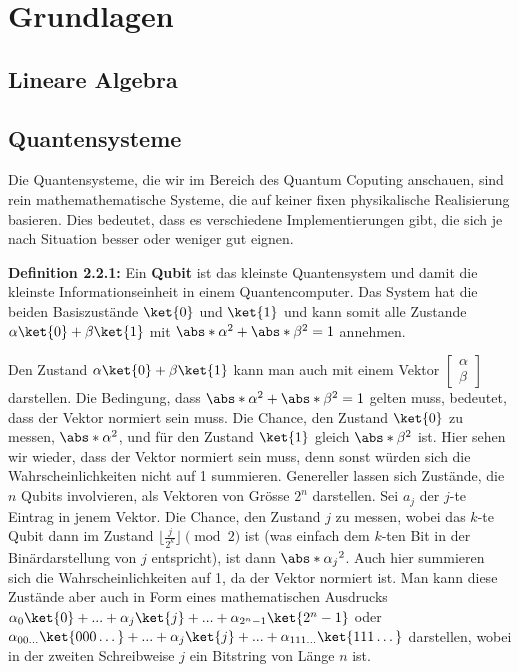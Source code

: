 \chapter{Grundlagen}
\section{Lineare Algebra}

\section{Quantensysteme}
Die Quantensysteme, die wir im Bereich des Quantum Coputing anschauen, sind rein mathemathematische Systeme, die auf keiner fixen physikalische Realisierung basieren. Dies bedeutet, dass es verschiedene Implementierungen gibt, die sich je nach Situation besser oder weniger gut eignen.

\textbf{Definition 2.2.1:} Ein \textbf{Qubit} ist das kleinste Quantensystem und damit die kleinste Informationseinheit in einem Quantencomputer. Das System hat die beiden Basiszustände $\ket{0}$ und $\ket{1}$ und kann somit alle Zustande $\alpha\ket{0} + \beta\ket{1}$ mit $\abs*{\alpha}^2 + \abs*{\beta}^2 = 1$ annehmen.

Den Zustand $\alpha\ket{0} + \beta\ket{1}$ kann man auch mit einem Vektor $\begin{bmatrix}\alpha \\ \beta\end{bmatrix}$ darstellen. Die Bedingung, dass $\abs*{\alpha}^2 + \abs*{\beta}^2 = 1$ gelten muss, bedeutet, dass der Vektor normiert sein muss. Die Chance, den Zustand $\ket{0}$ zu messen, $\abs*{\alpha}^2$, und für den Zustand $\ket{1}$ gleich $\abs*{\beta}^2$ ist. Hier sehen wir wieder, dass der Vektor normiert sein muss, denn sonst würden sich die Wahrscheinlichkeiten nicht auf 1 summieren.
Genereller lassen sich Zustände, die $n$ Qubits involvieren, als Vektoren von Grösse $2^n$ darstellen. Sei $a_j$ der $j$-te Eintrag in jenem Vektor. Die Chance, den Zustand $j$ zu messen, wobei das $k$-te Qubit dann im Zustand $\lfloor \frac{j}{2^k} \rfloor \pmod{2}$ ist (was einfach dem $k$-ten Bit in der Binärdarstellung von $j$ entspricht), ist dann $\abs*{\alpha_j}^2$. Auch hier summieren sich die Wahrscheinlichkeiten auf 1, da der Vektor normiert ist. Man kann diese Zustände aber auch in Form eines mathematischen Ausdrucks $\alpha_0\ket{0} + ... + \alpha_j\ket{j} + ... + \alpha_{2^n - 1}\ket{2^n - 1}$ oder $\alpha_{00\dots}\ket{000\dots} + ... + \alpha_{j}\ket{j} + ... + \alpha_{111\dots}\ket{111\dots}$ darstellen, wobei in der zweiten Schreibweise $j$ ein Bitstring von Länge $n$ ist.

